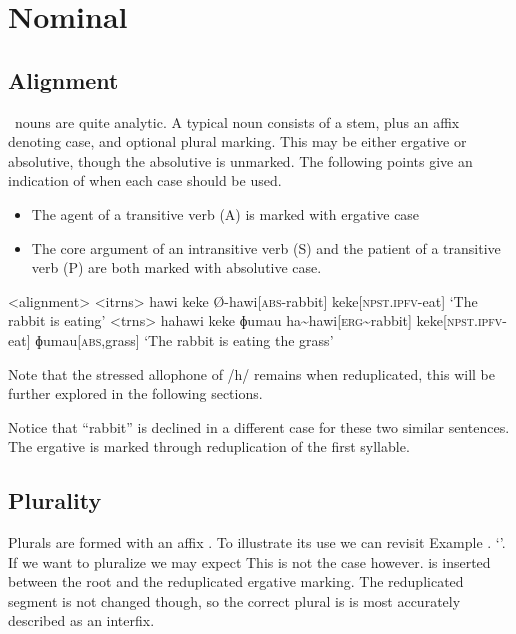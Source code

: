 \chapter{Nominal}
\section{Alignment}

\langname\ nouns are quite analytic.
A typical noun consists of a stem, plus an affix denoting case, and optional plural marking.
This may be either ergative or absolutive, though the absolutive is unmarked.
The following points give an indication of when each case should be used.
\begin{itemize}
  \item The agent of a transitive verb (A) is marked with ergative case
  \item The core argument of an intransitive verb (S) and the patient of a transitive verb (P) are both marked with absolutive case.
\end{itemize}

\pex<alignment>
\a<itrns>
  \begingl
  \glpreamble hawi keke
  \endpreamble
  Ø-hawi[\textsc{abs-}rabbit]
  keke[\textsc{npst.ipfv-}eat]
  \glft `The rabbit is eating'
  \endgl
  \a<trns>
  \begingl
  \glpreamble hahawi keke ɸumau
  \endpreamble
  ha\textasciitilde hawi[\textsc{erg\textasciitilde}rabbit]
  keke[\textsc{npst.ipfv-}eat]
  ɸumau[\textsc{abs,}grass]
  \glft `The rabbit is eating the grass'
  \endgl
  \xe

Note that the stressed allophone of /h/ remains when reduplicated, this will be further explored in the following sections.

Notice that ``rabbit'' is declined in a different case for these two similar sentences.
The ergative is marked through reduplication of the first syllable.

\section{Plurality}

Plurals are formed with an affix .
To illustrate its use we can revisit Example .
`'.
If we want to pluralize  we may expect  This is not the case however.
 is inserted between the root and the reduplicated ergative marking.
The reduplicated segment is not changed though, so the correct plural is   is most accurately described as an interfix.

